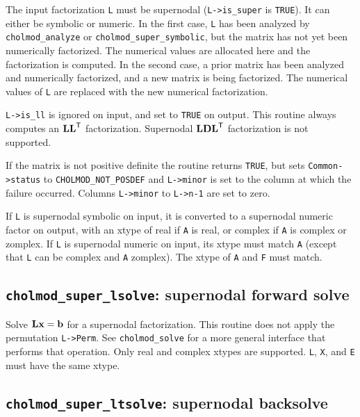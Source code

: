 \documentclass[11pt]{article}
\newcommand{\m}[1]{{\bf{#1}}}       %
\newcommand{\tr}{^{\sf T}}          %
\begin{document}
The input factorization {\tt L} must be supernodal ({\tt L->is\_super} is {\tt TRUE}).  It can
either be symbolic or numeric.  In the first case, {\tt L} has been analyzed by
{\tt cholmod\_analyze} or {\tt cholmod\_super\_symbolic}, but the matrix has not yet been
numerically factorized.  The numerical values are allocated here and the
factorization is computed.  In the second case, a prior matrix has been
analyzed and numerically factorized, and a new matrix is being factorized.
The numerical values of {\tt L} are replaced with the new numerical factorization.

{\tt L->is\_ll} is ignored on input, and set to {\tt TRUE} on output.  This routine always computes an $\m{LL}\tr$
factorization.  Supernodal $\m{LDL}\tr$ factorization is not supported.

If the matrix is not positive definite the routine returns {\tt TRUE}, but sets
{\tt Common->status} to {\tt CHOLMOD\_NOT\_POSDEF} and {\tt L->minor} is set to the column at
which the failure occurred.  Columns {\tt L->minor} to {\tt L->n-1} are set to zero.

If {\tt L} is supernodal symbolic on input, it is converted to a supernodal numeric
factor on output, with an xtype of real if {\tt A} is real, or complex if {\tt A} is
complex or zomplex.  If {\tt L} is supernodal numeric on input, its xtype must
match {\tt A} (except that {\tt L} can be complex and {\tt A} zomplex).  The xtype of {\tt A} and {\tt F}
must match.

\newpage \subsection{{\tt cholmod\_super\_lsolve}: supernodal forward solve}


Solve $\m{Lx}=\m{b}$ for a supernodal factorization.  This routine does not
apply the permutation {\tt L->Perm}.  See {\tt cholmod\_solve} for a more general
interface that performs that operation.
Only real and complex xtypes are supported.
{\tt L}, {\tt X}, and {\tt E} must have the same xtype.

\subsection{{\tt cholmod\_super\_ltsolve}: supernodal backsolve}
\end{document}
